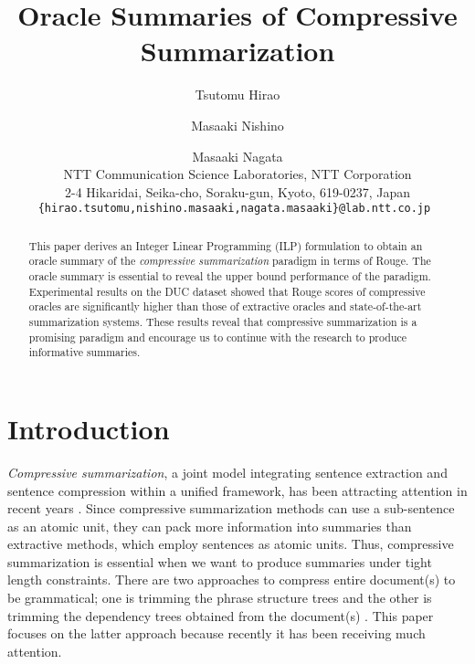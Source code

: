 \documentclass[11pt,a4paper]{article}
\title{Oracle Summaries of Compressive Summarization}
\author{
Tsutomu Hirao \and Masaaki Nishino \and Masaaki Nagata\\
NTT Communication Science Laboratories, NTT Corporation\\
2-4 Hikaridai, Seika-cho, Soraku-gun, Kyoto, 619-0237, Japan\\
{\tt \{hirao.tsutomu,nishino.masaaki,nagata.masaaki\}@lab.ntt.co.jp }
}
\date{}
\begin{document}
\maketitle
\begin{abstract}
This paper derives an Integer Linear Programming (ILP) formulation to
obtain an oracle summary of the {\it compressive summarization} paradigm in
terms of {\sc Rouge}.
The oracle summary is essential to reveal the upper bound performance of
the paradigm.
Experimental results on the DUC dataset showed that {\sc Rouge} scores
of compressive oracles are significantly higher than those of extractive
oracles and state-of-the-art summarization systems.
These results reveal that compressive summarization is a promising
 paradigm and encourage us to continue with the research to produce
 informative summaries.
\end{abstract}

\section{Introduction}

{\it Compressive summarization}, a joint model
integrating sentence extraction and sentence compression within a unified framework, 
has been attracting attention in recent years \citep{martins-smith09,kirkpatrick11,Almeida13,Qian13,kikuchi:2014,Yao:IJCAI15}.
Since compressive summarization methods can use a sub-sentence as an
atomic unit, they can pack more information into summaries
than extractive methods, which employ sentences as atomic units.
Thus, compressive summarization is essential when we want to produce
summaries under tight length constraints.
There are two approaches to compress entire document(s) to be
grammatical; one is trimming the phrase structure trees
\citep{kirkpatrick11} and the other is trimming the dependency trees
obtained from the document(s)
\citep{martins-smith09,Almeida13,Qian13,kikuchi:2014,Yao:IJCAI15}. This paper focuses on
 the latter approach because recently it has been receiving much attention.
\end{document}
